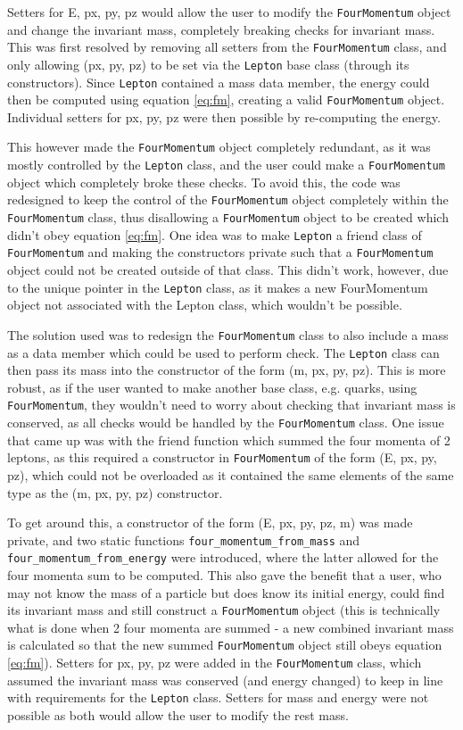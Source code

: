 \documentclass[11pt, letterpaper]{article}
\begin{document}
Setters for E, px, py, pz would allow the user to modify the \verb|FourMomentum| object and change the invariant mass, completely breaking checks for invariant mass. This was first resolved by removing all setters from the \verb|FourMomentum| class, and only allowing (px, py, pz) to be set via the \verb|Lepton| base class (through its constructors). Since \verb|Lepton| contained a mass data member, the energy could then be computed using equation \ref{eq:fm}, creating a valid \verb|FourMomentum| object. Individual setters for px, py, pz were then possible by re-computing the energy.

This however made the \verb|FourMomentum| object completely redundant, as it was mostly controlled by the \verb|Lepton| class, and the user could make a \verb|FourMomentum| object which completely broke these checks. To avoid this, the code was redesigned to keep the control of the \verb|FourMomentum| object completely within the \verb|FourMomentum| class, thus disallowing a \verb|FourMomentum| object to be created which didn't obey equation \ref{eq:fm}. One idea was to make \verb|Lepton| a friend class of \verb|FourMomentum| and making the constructors private such that a \verb|FourMomentum| object could not be created outside of that class. This didn't work, however, due to the unique pointer in the \verb|Lepton| class, as it makes a new FourMomentum object not associated with the Lepton class, which wouldn't be possible.

The solution used was to redesign the \verb|FourMomentum| class to also include a mass as a data member which could be used to perform check. The \verb|Lepton| class can then pass its mass into the constructor of the form (m, px, py, pz). This is more robust, as if the user wanted to make another base class, e.g. quarks, using \verb|FourMomentum|, they wouldn't need to worry about checking that invariant mass is conserved, as all checks would be handled by the \verb|FourMomentum| class. One issue that came up was with the friend function which summed the four momenta of 2 leptons, as this required a constructor in \verb|FourMomentum| of the form (E, px, py, pz), which could not be overloaded as it contained the same elements of the same type as the (m, px, py, pz) constructor.

To get around this, a constructor of the form (E, px, py, pz, m) was made private, and two static functions \verb|four_momentum_from_mass| and \verb|four_momentum_from_energy| were introduced, where the latter allowed for the four momenta sum to be computed. This also gave the benefit that a user, who may not know the mass of a particle but does know its initial energy, could find its invariant mass and still construct a \verb|FourMomentum| object (this is technically what is done when 2 four momenta are summed - a new combined invariant mass is calculated so that the new summed \verb|FourMomentum| object still obeys equation \ref{eq:fm}). Setters for px, py, pz were added in the \verb|FourMomentum| class, which assumed the invariant mass was conserved (and energy changed) to keep in line with requirements for the \verb|Lepton| class. Setters for mass and energy were not possible as both would allow the user to modify the rest mass.
\end{document}
